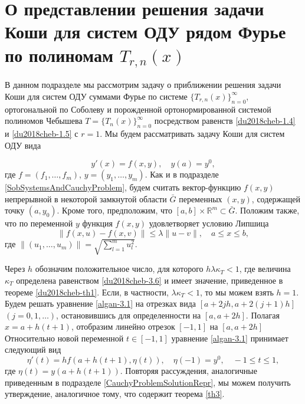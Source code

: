 \section{О представлении решения задачи Коши для систем ОДУ рядом Фурье по полиномам $T_{r,n}(x)$}
В данном подразделе мы рассмотрим задачу о приближении решения задачи Коши для систем ОДУ  суммами  Фурье по системе $\{T_{r,n}(x)\}_{n=0}^\infty$, ортогональной по Соболеву и порожденной ортонормированной системой полиномов Чебышева $T=\{T_{n}(x)\}_{n=0}^\infty$ посредством равенств \eqref{du2018cheb-1.4} и \eqref{du2018cheb-1.5} с $r=1$.
 Мы будем рассматривать задачу Коши для систем ОДУ вида

\begin{equation}\label{algan-3.1}
y'(x)=f(x,y), \quad y(a)=y^0,
\end{equation}
где  $f=(f_1, \ldots, f_m)$, $y=(y_1, \ldots, y_m)$. Как и в подразделе \ref{SobSystemsAndCauchyProblem}, будем считать вектор-функцию $f(x,y)$  непрерывной в некоторой замкнутой  области $\bar G$ переменных $(x,y)$, содержащей точку $(a,y_0)$. Кроме того, предположим, что $[a,b]\times\mathbb{R}^m\subset\bar G$. Положим также, что по переменной $y$ функция $f(x,y)$ удовлетворяет условию Липшица
 \begin{equation}\label{algan-3.2}
\|f(x,u)-f(x,v)\|\le \lambda\|u-v\|, \quad a\le x \le b,
\end{equation}
где $\|(u_1,\ldots,u_m)\|=\sqrt{\sum_{l=1}^m u_l^2}$.

Через $h$ обозначим положительное число, для которого $h\lambda\kappa_T<1$, где  величина $\kappa_T$ определена равенством \eqref{du2018cheb-3.6} и имеет значение, приведенное в теореме \ref{du2018cheb-th1}. Если, в частности, $\lambda\kappa_T<1$, то мы можем взять $h=1$. Будем  решать уравнение \eqref{algan-3.1} на отрезках вида $[a+2jh,a+2(j+1)h]$ $(j=0,1,\ldots)$, остановившись для определенности на $[a,a+2h]$. Полагая $x=a+h(t+1)$, отобразим линейно отрезок $[-1,1]$ на $[a,a+2h]$   Относительно новой переменной $t\in [-1,1]$ уравнение \eqref{algan-3.1} принимает следующий вид
\begin{equation}\label{algan-3.3}
\eta'(t)=hf(a+h(t+1),\eta(t)), \quad \eta(-1)=y^0,\quad -1\le t\le  1,
\end{equation}
где $\eta(t)=y(a+h(t+1))$.  
Повторяя рассуждения, аналогичные приведенным в подразделе \ref{CauchyProblemSolutionRepr}, мы можем получить утверждение, аналогичное тому, что содержит теорема \ref{th3}.


